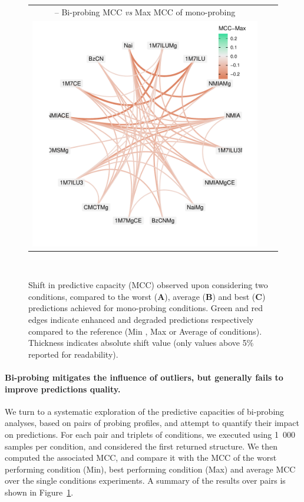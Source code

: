 \documentclass[a4,center,fleqn]{NAR}
\newcommand{\Software}[1]{\text{\ttfamily\bfseries #1}}
\newcommand{\OurTool}{\Software{IPANEMAP}\xspace}
\begin{document}
\begin{figure}
{\begin{tabular}{@{}c@{}c@{}c@{}}
			{\sf {\bfseries C} -- \relsize{-1}Bi-probing MCC \emph{vs} Max MCC of mono-probing}\\
			\includegraphics[width=\W\linewidth,trim=1cm 1cm .8cm .3cm,clip]{graphs/didy/MCC-vs-Max}\\
		\end{tabular}\\}
	\caption{Shift in \OurTool{} predictive capacity (MCC) observed upon considering two conditions, compared to the worst ({\sf\bfseries A}),  average ({\sf\bfseries B}) 
		and best ({\sf\bfseries C}) 
		predictions achieved for mono-probing conditions. Green and red edges indicate enhanced and degraded predictions respectively compared to the reference (Min%
		, Max 
		or Average of conditions). Thickness indicates absolute shift value (only values above 5\% reported for readability).\label{fig:pairwise}}
\end{figure}

\paragraph{Bi-probing mitigates the influence of outliers, but generally fails to improve predictions quality.}
We turn to a systematic exploration of the predictive capacities of bi-probing analyses, based on pairs of probing profiles, and attempt to quantify their impact on \OurTool predictions. For each pair and triplets of conditions, we executed \OurTool using 1~000 samples per condition, and considered the first returned structure. We then computed the associated MCC, and compare it with the MCC of the worst performing condition (Min), best performing condition (Max) and average MCC over the single conditions experiments. A summary of the results over pairs is shown in Figure~\ref{fig:pairwise}. 
\end{document}
